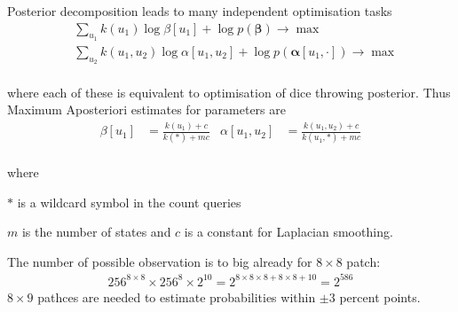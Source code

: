\documentclass[landscape,footrule]{foils}
\renewcommand{\vec}[1]{\boldsymbol{#1}}
\begin{document}
\enlargethispage{4cm}
Posterior decomposition leads to many independent optimisation tasks\vspace*{-2ex}
\begin{align*}
&\sum_{u_1} k(u_1)\log \beta[u_1] + \log p(\vec{\beta})\to\max\\
&\sum_{u_2} k(u_1,u_2)\log\alpha[u_1,u_2]+\log p(\vec{\alpha}[u_1,\cdot])\to\max 
\end{align*}\vspace*{-4ex} \ \\
where each of these is equivalent to optimisation of dice throwing posterior. 
Thus Maximum Aposteriori estimates for parameters are \vspace*{-2ex}
\begin{align*}
\beta[u_1]&=\frac{k(u_1)+c}{k(*)+mc} &
\alpha[u_1,u_2]&=\frac{k(u_1,u_2)+c}{k(u_1,*)+mc}
\end{align*}\vspace*{-4ex}\ \\
where
\begin{triangles}
\item $*$ is a wildcard symbol in the count queries
\item $m$ is the number of  states and $c$ is a constant for Laplacian smoothing. 
\end{triangles}

\enlargethispage{0.5cm}

The number of possible observation is to big already for $8\times 8$ patch:
\begin{align*}
256^{8\times 8}\times 256^{8}\times 2^{10} = 2^{8\times 8\times 8+ 8\times 8 +10}= 2^{586}
\end{align*}
$8\times 9$ pathces are needed to estimate probabilities within $\pm 3$ percent points.

\end{document}
